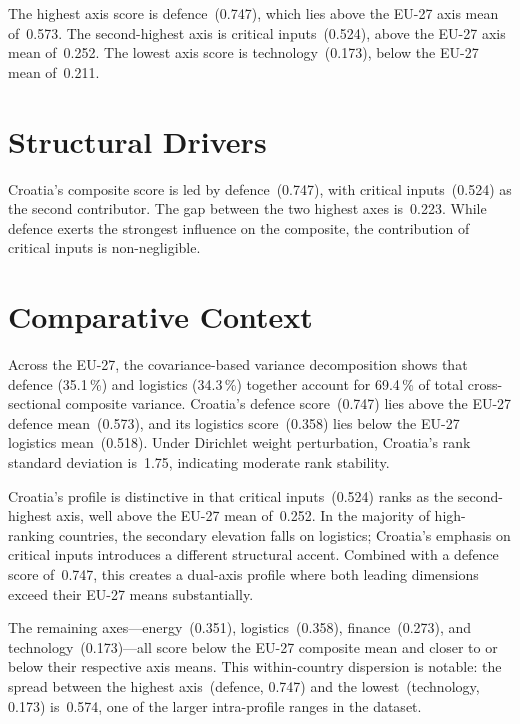 \documentclass[12pt,a4paper]{article}
\begin{document}
The highest axis score is defence~(0.747), which lies above the EU-27 axis mean of~0.573.  The second-highest axis is critical inputs~(0.524), above the EU-27 axis mean of~0.252.  The lowest axis score is technology~(0.173), below the EU-27 mean of~0.211.


\section{Structural Drivers}
\label{sec:drivers}

\begin{sloppypar}
Croatia's composite score is led by defence~(0.747), with critical inputs~(0.524) as the second contributor.  The gap between the two highest axes is~0.223.  While defence exerts the strongest influence on the composite, the contribution of critical inputs is non-negligible.
\end{sloppypar}


\section{Comparative Context}
\label{sec:comparative}

Across the EU-27, the covariance-based variance decomposition shows that defence (35.1\,\%) and logistics (34.3\,\%) together account for 69.4\,\% of total cross-sectional composite variance.  Croatia's defence score~(0.747) lies above the EU-27 defence mean~(0.573), and its logistics score~(0.358) lies below the EU-27 logistics mean~(0.518).  Under Dirichlet weight perturbation, Croatia's rank standard deviation is~1.75, indicating moderate rank stability.



Croatia's profile is distinctive in that critical inputs~(0.524) ranks as the second-highest axis, well above the EU-27 mean of~0.252.  In the majority of high-ranking countries, the secondary elevation falls on logistics; Croatia's emphasis on critical inputs introduces a different structural accent.  Combined with a defence score of~0.747, this creates a dual-axis profile where both leading dimensions exceed their EU-27 means substantially.

The remaining axes---energy~(0.351), logistics~(0.358), finance~(0.273), and technology~(0.173)---all score below the EU-27 composite mean and closer to or below their respective axis means.  This within-country dispersion is notable: the spread between the highest axis~(defence, 0.747) and the lowest~(technology, 0.173) is~0.574, one of the larger intra-profile ranges in the dataset.
\end{document}
